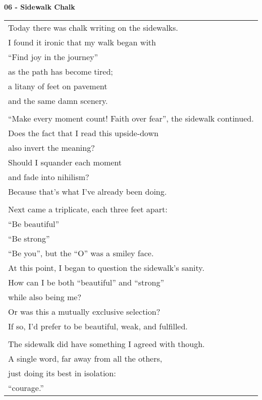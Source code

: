 \documentclass{article}
\begin{document}
\begin{center}
\textbf{06 - Sidewalk Chalk} \\
\vspace*{2ex}
\begin{tabular}{l} 
Today there was chalk writing on the sidewalks. \\
I found it ironic that my walk began with \\
``Find joy in the journey'' \\
as the path has become tired; \\
a litany of feet on pavement \\
and the same damn scenery. \\
\\
``Make every moment count! Faith over fear'', %
the sidewalk continued. \\
Does the fact that I read this upside-down \\
also invert the meaning? \\
Should I squander each moment \\ %
and fade into nihilism? \\
Because that's what I've already been doing. \\
\\
Next came a triplicate, each three feet apart: \\
``Be beautiful'' \\
``Be strong'' \\
``Be you'', but the ``O'' was a smiley face. \\
At this point, I began to question the sidewalk's sanity. \\
How can I be both ``beautiful'' and ``strong'' \\
while also being me? \\
Or was this a mutually exclusive selection? \\
If so, I'd prefer to be beautiful, weak, and fulfilled. \\
\\
The sidewalk did have something I agreed with though. \\
A single word, far away from all the others, \\
just doing its best in isolation: \\ %
``courage.''
\end{tabular}
\end{center}
\end{document}
